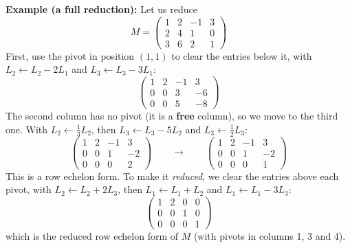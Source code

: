 \documentclass[]{article}
\begin{document}
	\noindent \textbf{Example (a full reduction):}
	Let us reduce
	$$
	M = \begin{pmatrix}
		1 & 2 & -1 & 3 \\
		2 & 4 & 1 & 0 \\
		3 & 6 & 2 & 1
	\end{pmatrix}
	$$
	First, use the pivot in position $(1,1)$ to clear the entries below it, with $L_2 \leftarrow L_2 - 2L_1$ and $L_3 \leftarrow L_3 - 3L_1$:
	$$
	\begin{pmatrix}
		1 & 2 & -1 & 3 \\
		0 & 0 & 3 & -6 \\
		0 & 0 & 5 & -8
	\end{pmatrix}
	$$
	The second column has no pivot (it is a \textbf{free} column), so we move to the third one.
	With $L_2 \leftarrow \frac{1}{3} L_2$, then $L_3 \leftarrow L_3 - 5L_2$ and $L_3 \leftarrow \frac{1}{2}L_3$:
	$$
	\begin{pmatrix}
		1 & 2 & -1 & 3 \\
		0 & 0 & 1 & -2 \\
		0 & 0 & 0 & 2
	\end{pmatrix}
	\qquad \longrightarrow \qquad
	\begin{pmatrix}
		1 & 2 & -1 & 3 \\
		0 & 0 & 1 & -2 \\
		0 & 0 & 0 & 1
	\end{pmatrix}
	$$
	This is a row echelon form.
	To make it \textit{reduced}, we clear the entries above each pivot, with $L_2 \leftarrow L_2 + 2L_3$, then $L_1 \leftarrow L_1 + L_2$ and $L_1 \leftarrow L_1 - 3L_3$:
	$$
	\begin{pmatrix}
		1 & 2 & 0 & 0 \\
		0 & 0 & 1 & 0 \\
		0 & 0 & 0 & 1
	\end{pmatrix}
	$$
	which is the reduced row echelon form of $M$ (with pivots in columns 1, 3 and 4).
\end{document}
